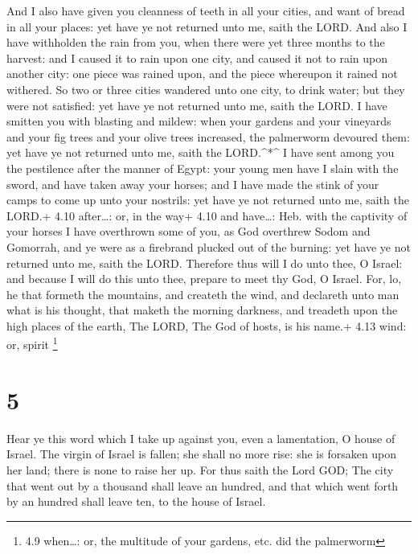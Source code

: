  And I also have given you cleanness of teeth in all your
cities, and want of bread in all your places: yet have ye not returned
unto me, saith the LORD.  And also I have withholden the
rain from you, when there were yet three months to the harvest: and I
caused it to rain upon one city, and caused it not to rain upon another
city: one piece was rained upon, and the piece whereupon it rained not
withered.  So two or three cities wandered unto one city, to
drink water; but they were not satisfied: yet have ye not returned unto
me, saith the LORD.  I have smitten you with blasting and
mildew: when your gardens and your vineyards and your fig trees and your
olive trees increased, the palmerworm devoured them: yet have ye not
returned unto me, saith the LORD.\^{}*\^{}  I have sent
among you the pestilence after the manner of Egypt: your young men have
I slain with the sword, and have taken away your horses; and I have made
the stink of your camps to come up unto your nostrils: yet have ye not
returned unto me, saith the LORD.+ 4.10 after\ldots: or, in the way+
4.10 and have\ldots: Heb. with the captivity of your horses
 I have overthrown some of you, as God overthrew Sodom and
Gomorrah, and ye were as a firebrand plucked out of the burning: yet
have ye not returned unto me, saith the LORD.  Therefore
thus will I do unto thee, O Israel: and because I will do this unto
thee, prepare to meet thy God, O Israel.  For, lo, he that
formeth the mountains, and createth the wind, and declareth unto man
what is his thought, that maketh the morning darkness, and treadeth upon
the high places of the earth, The LORD, The God of hosts, is his name.+
4.13 wind: or, spirit \footnote{4.9 when\ldots: or, the multitude of
  your gardens, etc. did the palmerworm}

\hypertarget{section-4}{%
\section{5}\label{section-4}}

 Hear ye this word which I take up against you, even a
lamentation, O house of Israel.  The virgin of Israel is
fallen; she shall no more rise: she is forsaken upon her land; there is
none to raise her up.  For thus saith the Lord GOD; The city
that went out by a thousand shall leave an hundred, and that which went
forth by an hundred shall leave ten, to the house of Israel.

